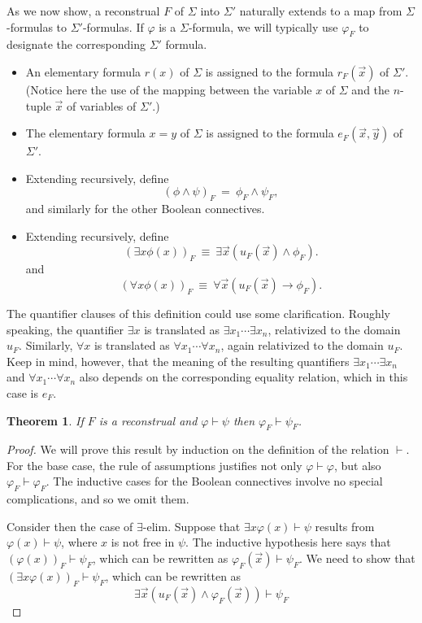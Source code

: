 \documentclass[11pt,fleqn]{article}
\newtheorem{thm}[prop]{Theorem}
\theoremstyle{definition}
\theoremstyle{remark}
\newcommand{\2}{\mathscr}
\newcommand{\vp}{\varphi}
\begin{document}
  As we now show, a reconstrual $F$ of $\Sigma$ into $\Sigma '$
  naturally extends to a map from $\Sigma$-formulas to
  $\Sigma '$-formulas.  If $\vp$ is a $\Sigma$-formula, we will
  typically use $\vp _F$ to designate the corresponding $\Sigma '$
  formula.  

  \begin{itemize}
  \item An elementary formula $r(x)$ of $\Sigma$ is assigned to the
    formula $r_F(\vec{x})$ of $\Sigma '$.  (Notice here the use of the
    mapping between the variable $x$ of $\Sigma$ and the $n$-tuple
    $\vec{x}$ of variables of $\Sigma '$.)
  \item The elementary formula $x=y$ of $\Sigma$ is assigned to the
    formula $e_F(\vec{x},\vec{y})$ of $\Sigma '$.
  \item Extending recursively, define
    \[ (\phi\wedge \psi )_F \: = \: \phi _F\wedge \psi _F ,\]
    and similarly for the other Boolean connectives. 
  \item Extending recursively, define
  \[ (\exists x \phi (x))_F \: \equiv \: \exists
    \vec{x}(u_F(\vec{x})\wedge \phi _F ) .\] 
  and
  \[ (\forall x\phi (x))_F\:\equiv \: \forall \vec{x}(u_F(\vec{x})\to \phi
    _F ) .\]
\end{itemize}
The quantifier clauses of this definition could use some
clarification.  Roughly speaking, the quantifier $\exists x$ is
translated as $\exists x_1\cdots \exists x_n$, relativized to the
domain $u_F$.  Similarly, $\forall x$ is translated as
$\forall x_1\cdots \forall x_n$, again relativized to the domain
$u_F$.  Keep in mind, however, that the meaning of the resulting
quantifiers $\exists x_1\cdots \exists x_n$ and
$\forall x_1\cdots \forall x_n$ also depends on the corresponding
equality relation, which in this case is $e_F$.

\begin{thm} If $F$ is a reconstrual and $\vp\vdash\psi$ then
  $\vp _F\vdash \psi _F$. \end{thm}

\begin{proof} We will prove this result by induction on the definition
  of the relation $\vdash$.  For the base case, the rule of
  assumptions justifies not only $\vp\vdash\vp$, but also
  $\vp _F\vdash\vp _F$.  The inductive cases for the Boolean
  connectives involve no special complications, and so we omit them.

  Consider then the case of $\exists$-elim.  Suppose that
  $\exists x\vp (x)\vdash \psi$ results from $\vp (x)\vdash \psi$,
  where $x$ is not free in $\psi$.  The inductive hypothesis here says
  that $(\vp (x))_F\vdash \psi _F$, which can be rewritten as
  $\vp _F(\vec{x})\vdash \psi _F$.  We need to show that
  $(\exists x\vp (x))_F\vdash \psi _F$, which can be rewritten as
  \[ \exists \vec{x}(u_F(\vec{x})\wedge \vp _F(\vec{x}))\vdash \psi _F \]

\end{proof}
\end{document}

